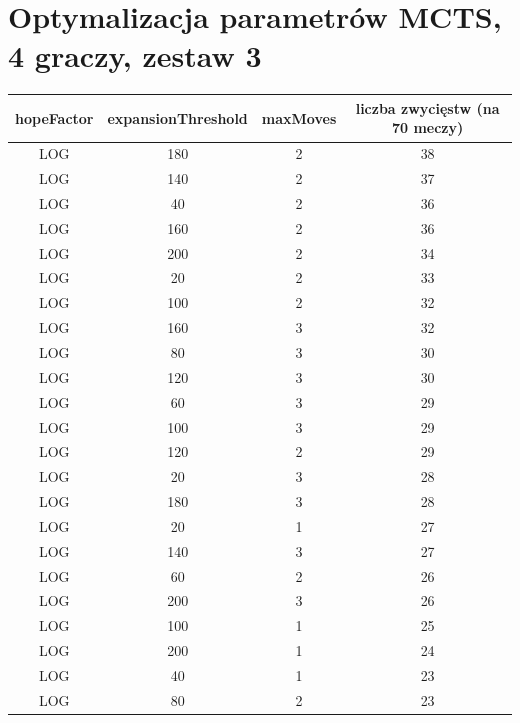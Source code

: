 \documentclass{pracamgr}
\begin{document}
\begin{appendices}
\begin{center}
\begin{tabular}{| c | c | c | c |}
    \end{tabular}
\end{center}

\vfill
\hspace{0pt}
\pagebreak

\section{Optymalizacja parametrów MCTS, 4 graczy, zestaw 3\label{results-3-4p}}

\begin{center}
    \vspace{0pt}
    \begin{tabular}{| c | c | c | c |}
	\hline
    hopeFactor & expansionThreshold & maxMoves & liczba zwycięstw (na 70 meczy) \\ \hline
        LOG & 180 & 2 & 38 \\ \hline
        LOG & 140 & 2 & 37 \\ \hline
        LOG & 40 & 2 & 36 \\ \hline
        LOG & 160 & 2 & 36 \\ \hline
        LOG & 200 & 2 & 34 \\ \hline
        LOG & 20 & 2 & 33 \\ \hline
        LOG & 100 & 2 & 32 \\ \hline
        LOG & 160 & 3 & 32 \\ \hline
        LOG & 80 & 3 & 30 \\ \hline
        LOG & 120 & 3 & 30 \\ \hline
        LOG & 60 & 3 & 29 \\ \hline
        LOG & 100 & 3 & 29 \\ \hline
        LOG & 120 & 2 & 29 \\ \hline
        LOG & 20 & 3 & 28 \\ \hline
        LOG & 180 & 3 & 28 \\ \hline
        LOG & 20 & 1 & 27 \\ \hline
        LOG & 140 & 3 & 27 \\ \hline
        LOG & 60 & 2 & 26 \\ \hline
        LOG & 200 & 3 & 26 \\ \hline
        LOG & 100 & 1 & 25 \\ \hline
        LOG & 200 & 1 & 24 \\ \hline
        LOG & 40 & 1 & 23 \\ \hline
        LOG & 80 & 2 & 23 \\ \hline

\end{tabular}
\end{center}
\end{appendices}
\end{document}
